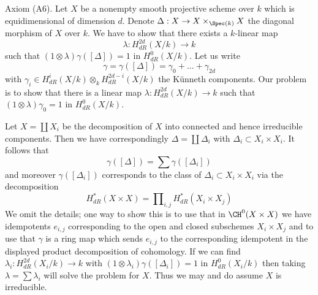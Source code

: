 \medskip\noindent
Axiom (A6). Let $X$ be a nonempty smooth projective scheme over $k$
which is equidimensional of dimension $d$. Denote
$\Delta : X \to X \times_{\Spec(k)} X$
the diagonal morphism of $X$ over $k$. We have to show that there
exists a $k$-linear map
$$
\lambda : H_{dR}^{2d}(X/k) \longrightarrow k
$$
such that $(1 \otimes \lambda)\gamma([\Delta]) = 1$ in $H^0_{dR}(X/k)$.
Let us write
$$
\gamma = \gamma([\Delta]) = \gamma_0 + \ldots + \gamma_{2d}
$$
with $\gamma_i \in H_{dR}^i(X/k) \otimes_k H_{dR}^{2d - i}(X/k)$
the K\"unneth components. Our problem is to show that there is a
linear map $\lambda : H_{dR}^{2d}(X/k) \to k$ such that
$(1 \otimes \lambda)\gamma_0 = 1$ in $H^0_{dR}(X/k)$.

\medskip\noindent
Let $X = \coprod X_i$ be the decomposition of $X$ into connected
and hence irreducible components. Then we have correspondingly
$\Delta = \coprod \Delta_i$ with $\Delta_i \subset X_i \times X_i$.
It follows that
$$
\gamma([\Delta]) = \sum \gamma([\Delta_i])
$$
and moreover $\gamma([\Delta_i])$ corresponds to the class of
$\Delta_i \subset X_i \times X_i$ via the decomposition
$$
H^*_{dR}(X \times X) = \prod\nolimits_{i, j} H^*_{dR}(X_i \times X_j)
$$
We omit the details; one way to show this is to use that in
$\CH^0(X \times X)$ we have idempotents $e_{i, j}$ corresponding to
the open and closed subschemes $X_i \times X_j$ and to use that
$\gamma$ is a ring map which sends $e_{i, j}$ to the corresponding
idempotent in the displayed product decomposition of cohomology.
If we can find $\lambda_i : H_{dR}^{2d}(X_i/k) \to k$ with
$(1 \otimes \lambda_i)\gamma([\Delta_i]) = 1$ in $H^0_{dR}(X_i/k)$
then taking $\lambda = \sum \lambda_i$ will solve the problem for $X$.
Thus we may and do assume $X$ is irreducible.

